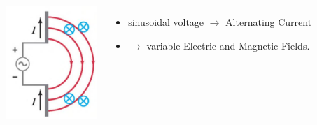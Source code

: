\documentclass[]{beamer}
\begin{document}
\begin{frame}


   \begin{columns}[c]
   \column{2in}  %
  
  \begin{center}
  \includegraphics[height=1.7in]{images5/antenna2.jpg}
\end{center}


   \column{2.7in}


\begin{itemize}
\pause
\item sinusoidal voltage   $\rightarrow$ Alternating Current
\pause
\item $\rightarrow$ variable Electric and Magnetic Fields.
\end{itemize}

   \end{columns}


  \end{frame}


\end{document}
